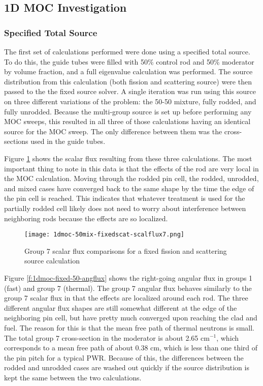 \subsection{1D MOC Investigation}

\subsubsection{Specified Total Source}

The first set of calculations performed were done using a specified total source.  To do this, the guide tubes were filled with 50\% control rod and 50\% moderator by volume fraction, and a full eigenvalue calculation was performed.  The source distribution from this calculation (both fission and scattering source) were then passed to the the fixed source solver.  A single iteration was run using this source on three different variations of the problem: the 50-50 mixture, fully rodded, and fully unrodded.  Because the multi-group source is set up before performing any MOC sweeps, this resulted in all three of those calculations having an identical source for the MOC sweep.  The only difference between them was the cross-sections used in the guide tubes.

Figure \ref{f:1dmoc-fixed-50-scalflux7} shows the scalar flux resulting from these three calculations.  The most important thing to note in this data is that the effects of the rod are very local in the MOC calculation.  Moving through the rodded pin cell, the rodded, unrodded, and mixed cases have converged back to the same shape by the time the edge of the pin cell is reached.  This indicates that whatever treatment is used for the partially rodded cell likely does not need to worry about interference between neighboring rods because the effects are so localized.

\begin{figure}[H]
    \centering
    \texttt{[image: 1dmoc-50mix-fixedscat-scalflux7.png]}
    \caption{Group 7 scalar flux comparisons for a fixed fission and scattering source calculation}\label{f:1dmoc-fixed-50-scalflux7}
\end{figure}

Figure \ref{f:1dmoc-fixed-50-angflux} shows the right-going angular flux in groups 1 (fast) and group 7 (thermal).  The group 7 angular flux behaves similarly to the group 7 scalar flux in that the effects are localized around each rod.  The three different angular flux shapes are still somewhat different at the edge of the neighboring pin cell, but have pretty much converged upon reaching the clad and fuel.  The reason for this is that the mean free path of thermal neutrons is small.  The total group 7 cross-section in the moderator is about 2.65 cm$^{-1}$, which corresponds to a mean free path of about 0.38 cm, which is less than one third of the pin pitch for a typical PWR.  Because of this, the differences between the rodded and unrodded cases are washed out quickly if the source distribution is kept the same between the two calculations.


